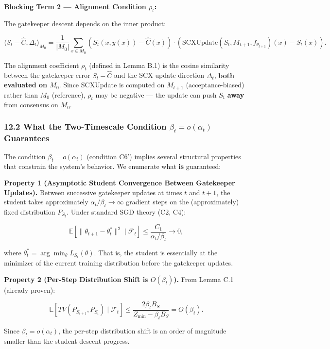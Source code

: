\documentclass[
  12pt,
]{article}
\begin{document}
\textbf{Blocking Term 2 --- Alignment Condition \(\rho_t\):}

The gatekeeper descent depends on the inner product:

\[\langle S_t - \hat{C}, \Delta_t \rangle_{M_0} = \frac{1}{|M_0|} \sum_{x \in M_0} (S_t(x, y(x)) - \hat{C}(x)) \cdot (\text{SCXUpdate}(S_t, M_{t+1}, f_{\theta_{t+1}})(x) - S_t(x)).\]

The alignment coefficient \(\rho_t\) (defined in Lemma B.1) is the
cosine similarity between the gatekeeper error \(S_t - \hat{C}\) and the
SCX update direction \(\Delta_t\), \textbf{both evaluated on \(M_0\)}.
Since SCXUpdate is computed on \(M_{t+1}\) (acceptance-biased) rather
than \(M_0\) (reference), \(\rho_t\) may be negative --- the update can
push \(S_t\) \textbf{away} from consensus on \(M_0\).

\subsubsection{\texorpdfstring{12.2 What the Two-Timescale Condition
\(\beta_t = o(\alpha_t)\)
Guarantees}{12.2 What the Two-Timescale Condition \textbackslash beta\_t = o(\textbackslash alpha\_t) Guarantees}}\label{what-the-two-timescale-condition-beta_t-oalpha_t-guarantees}

The condition \(\beta_t = o(\alpha_t)\) (condition C6') implies several
structural properties that constrain the system's behavior. We enumerate
what \textbf{is} guaranteed:

\textbf{Property 1 (Asymptotic Student Convergence Between Gatekeeper
Updates).} Between successive gatekeeper updates at times \(t\) and
\(t+1\), the student takes approximately
\(\alpha_t / \beta_t \to \infty\) gradient steps on the (approximately)
fixed distribution \(P_{S_t}\). Under standard SGD theory (C2, C4):

\[\mathbb{E}[\|\theta_{t+1} - \theta_t^*\|^2 \mid \mathcal{F}_t] \leq \frac{C_1}{\alpha_t / \beta_t} \to 0,\]

where \(\theta_t^* = \arg\min_\theta L_{S_t}(\theta)\). That is, the
student is essentially at the minimizer of the current training
distribution before the gatekeeper updates.

\textbf{Property 2 (Per-Step Distribution Shift is \(O(\beta_t)\)).}
From Lemma C.1 (already proven):

\[\mathbb{E}[TV(P_{S_{t+1}}, P_{S_t}) \mid \mathcal{F}_t] \leq \frac{2\beta_t B_S}{Z_{\min} - \beta_t B_S} = O(\beta_t).\]

Since \(\beta_t = o(\alpha_t)\), the per-step distribution shift is an
order of magnitude smaller than the student descent progress.
\end{document}
